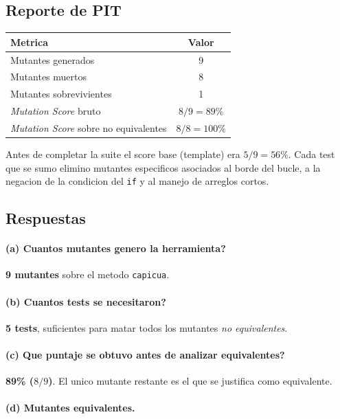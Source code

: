 \documentclass[12pt,a4paper]{article}
\begin{document}
\subsection{Reporte de PIT}

\begin{center}
\begin{tabular}{lc}
\toprule
Metrica & Valor \\
\midrule
Mutantes generados & 9 \\
Mutantes muertos   & 8 \\
Mutantes sobrevivientes & 1 \\
\emph{Mutation Score} bruto & $8/9 = 89\%$ \\
\emph{Mutation Score} sobre no equivalentes & $8/8 = 100\%$ \\
\bottomrule
\end{tabular}
\end{center}

Antes de completar la suite el score base (template) era $5/9 = 56\%$. Cada test que se sumo
elimino mutantes especificos asociados al borde del bucle, a la negacion de la condicion del
\texttt{if} y al manejo de arreglos cortos.

\subsection{Respuestas}

\paragraph{(a) \textquestiondown{}Cuantos mutantes genero la herramienta?}
\textbf{9 mutantes} sobre el metodo \texttt{capicua}.

\paragraph{(b) \textquestiondown{}Cuantos tests se necesitaron?}
\textbf{5 tests}, suficientes para matar todos los mutantes \emph{no equivalentes}.

\paragraph{(c) \textquestiondown{}Que puntaje se obtuvo antes de analizar equivalentes?}
\textbf{89\% ($8/9$)}. El unico mutante restante es el que se justifica como equivalente.

\paragraph{(d) Mutantes equivalentes.}
\end{document}
